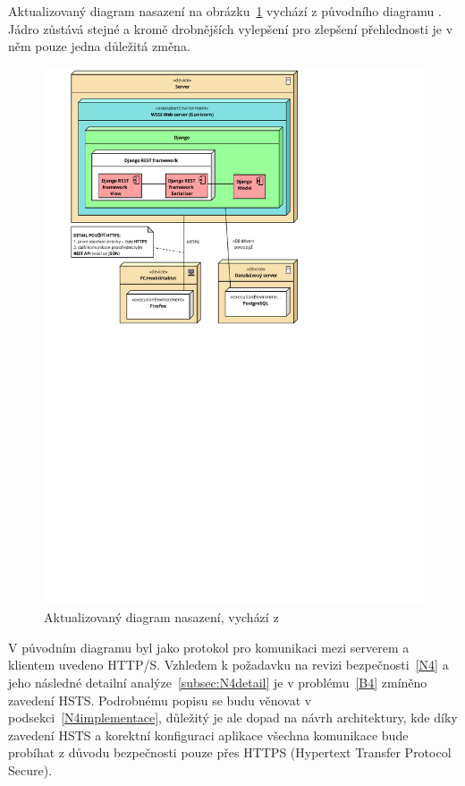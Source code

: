 Aktualizovaný diagram nasazení na obrázku~\ref{fig:deployment-diagram} vychází z původního diagramu \cite{bp}. Jádro zůstává stejné a kromě drobnějších vylepšení pro zlepšení přehlednosti je v něm pouze jedna důležitá změna.
    
\begin{figure}[h]\centering
	\includegraphics[width=1\textwidth]{img/deployment-diagram}
	\caption[Aktualizovaný diagram nasazení]{Aktualizovaný diagram nasazení, vychází z~\cite{bp}}\label{fig:deployment-diagram}
\end{figure}

V původním diagramu byl jako protokol pro komunikaci mezi serverem a klientem uvedeno HTTP/S. Vzhledem k požadavku na revizi bezpečnosti~\ref{N4} a jeho následné detailní analýze~\ref{subsec:N4detail} je v problému~\ref{B4} zmíněno zavedení HSTS. Podrobnému popisu se budu věnovat v podsekci~\ref{N4implementace}, důležitý je ale dopad na návrh architektury, kde díky zavedení HSTS a korektní konfiguraci aplikace všechna komunikace bude probíhat z důvodu bezpečnosti pouze přes HTTPS (Hypertext Transfer Protocol Secure).

